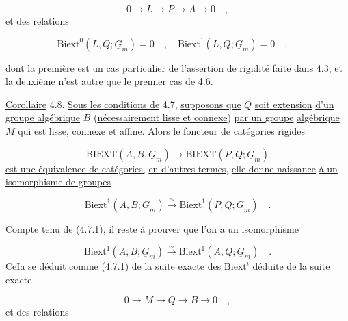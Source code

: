 \begin{equation*}
0 \longrightarrow L \longrightarrow P \longrightarrow A \longrightarrow 0 \quad ,
\end{equation*}
et des relations

\begin{equation*}
\mathrm{Biext}^0(L,Q;\underline{G}_m) = 0 \quad , \quad \mathrm{Biext}^1(L,Q;\underline{G}_m) = 0 \quad , \quad 
\end{equation*}


 dont la première est un cas particulier de l'assertion de rigidité faite dans 4.3, et la deuxième n'est autre que le premier cas de 4.6.

\underline{Corollaire} 4.8. \underline{Sous les conditions de} 4.7, \underline{supposons que} $Q$ \underline{soit extension} \underline{d'un groupe algébrique} $B$ (\underline{nécessairement lisse et connexe}) \underline{par un groupe} \underline{algébrique} $M$ \underline{qui est lisse}, \underline{connexe et} affine. \underline{Alors le foncteur de} \underline{catégories rigides}

\begin{equation*}
\mathrm{BIEXT}(A,B,\underline{G}_m) \longrightarrow \mathrm{BIEXT}(P,Q;\underline{G}_m)
\end{equation*}
\underline{est une équivalence de catégories,} \underline{en d'autres termes,} \underline{elle donne naissanee} \underline{à un isomorphisme de groupes}

\begin{equation}\tag{4.8.1}
\mathrm{Biext}^1(A,B;\underline{G}_m) \stackrel{\sim}{\longrightarrow} \mathrm{Biext}^1(P,Q;\underline{G}_m) \quad .
\end{equation}

Compte tenu de (4.7.1), il reste à prouver que l'on a un isomorphisme

\begin{equation*}
\mathrm{Biext}^1(A,B;\underline{G}_m) \stackrel{\sim}{\longrightarrow} \mathrm{Biext}^1(A,Q;\underline{G}_m) \quad .
\end{equation*}
CeIa se déduit comme (4.7.1) de la suite exacte des $\mathrm{Biext}^i$ déduite de la suite exacte

\begin{equation*}
0 \longrightarrow M \longrightarrow Q \longrightarrow B \longrightarrow 0 \quad ,
\end{equation*}
et des relations

